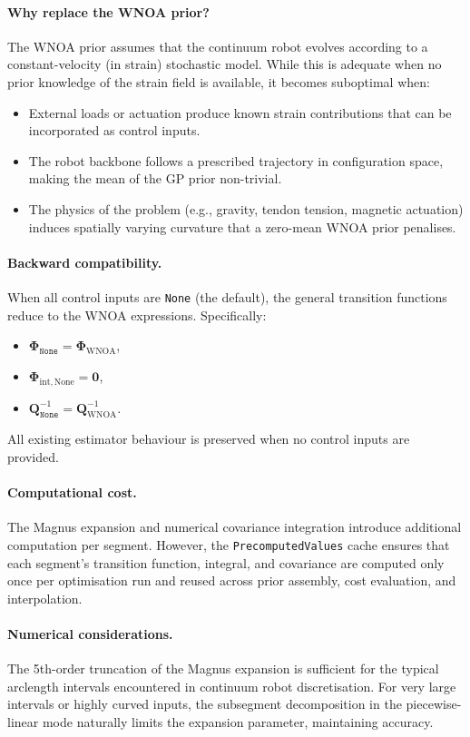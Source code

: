 \documentclass[11pt,a4paper]{article}
\newcommand{\inv}{^{-1}}
\newcommand{\bPhi}{\bm{\Phi}}
\newcommand{\bQ}{\mathbf{Q}}
\newcommand{\bzero}{\mathbf{0}}
\begin{document}
\paragraph{Why replace the WNOA prior?}
The WNOA prior assumes that the continuum robot evolves according to a constant-velocity (in strain) stochastic model.
While this is adequate when no prior knowledge of the strain field is available, it becomes suboptimal when:
\begin{itemize}
    \item External loads or actuation produce known strain contributions that can be incorporated as control inputs.
    \item The robot backbone follows a prescribed trajectory in configuration space, making the mean of the GP prior non-trivial.
    \item The physics of the problem (e.g., gravity, tendon tension, magnetic actuation) induces spatially varying curvature that a zero-mean WNOA prior penalises.
\end{itemize}

\paragraph{Backward compatibility.}
When all control inputs are \texttt{None} (the default), the general transition functions reduce to the WNOA expressions.
Specifically:
\begin{itemize}
    \item $\bPhi_{\texttt{None}} = \bPhi_{\mathrm{WNOA}}$,
    \item $\bPhi_{\mathrm{int,None}} = \bzero$,
    \item $\bQ_{\texttt{None}}\inv = \bQ_{\mathrm{WNOA}}\inv$.
\end{itemize}
All existing estimator behaviour is preserved when no control inputs are provided.

\paragraph{Computational cost.}
The Magnus expansion and numerical covariance integration introduce additional computation per segment.
However, the \texttt{PrecomputedValues} cache ensures that each segment's transition function, integral, and covariance are computed only once per optimisation run and reused across prior assembly, cost evaluation, and interpolation.

\paragraph{Numerical considerations.}
The 5th-order truncation of the Magnus expansion is sufficient for the typical arclength intervals encountered in continuum robot discretisation.
For very large intervals or highly curved inputs, the subsegment decomposition in the piecewise-linear mode naturally limits the expansion parameter, maintaining accuracy.
\end{document}
